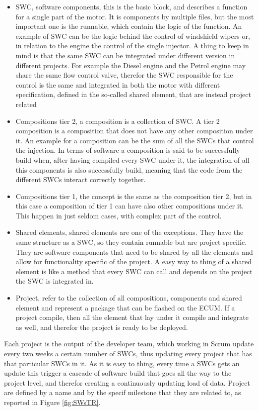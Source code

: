 \documentclass[../main.tex]{subfiles}
\begin{document}
\begin{itemize}
    \item SWC, software components, this is the basic block, and describes a function for a single part of the motor. It is components by multiple files, but the most important one is the runnable, which contain the logic of the function. An example of SWC can be the logic behind the control of windshield wipers or, in relation to the engine the control of the single injector. A thing to keep in mind is that the same SWC can be integrated under different version in different projects. For example the Diesel engine and the Petrol engine may share the same flow control valve, therefor the SWC responsible for the control is the same and integrated in both the motor with different specification, defined in the so-called shared element, that are instead project related
    \item Compositions tier 2, a composition is a collection of SWC. A tier 2 composition is a composition that does not have any other composition under it. An example for a composition can be the sum of all the SWCs that control the injection. In terms of software a composition is said to be successfully build when, after having compiled every SWC under it, the integration of all this components is also successfully build, meaning that the code from the different SWCs interact correctly together.
    \item Compositions tier 1, the concept is the same as the composition tier 2, but in this case a composition of tier 1 can have also other compositions under it. This happen in just seldom cases, with complex part of the control.
    \item Shared elements, shared elements are one of the exceptions. They have the same structure as a SWC, so they contain runnable but are project specific. They are software components that need to be shared by all the elements and allow for functionality specific of the project. A easy way to thing of a shared element is like a method that every SWC can call and depends on the project the SWC is integrated in.
    \item Project, refer to the collection of all compositions, components and shared element and represent a package that can be flashed on the \gls{ECUM}. If a project compile, then all the element that lay under it compile and integrate as well, and therefor the project is ready to be deployed. 
\end{itemize}
Each project is the output of the developer team, which working in Scrum update every two weeks a certain number of SWCs, thus updating every project that has that particular SWCs in it. As it is easy to thing, every time a SWCs gets an update this trigger a cascade of software build that goes all the way to the project level, and therefor creating a continuously updating load of data. Project are defined by a name and by the specif milestone that they are related to, as reported in Figure \ref{fig:SWsTR}.
\end{document}
